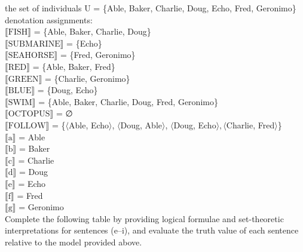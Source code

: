 {\ea the set of individuals U = \{Able, Baker, Charlie, Doug, Echo, Fred, Geronimo\}
\ex denotation assignments:\\
$\llbracket\text{FISH}\rrbracket$  = \{Able, Baker, Charlie, Doug\}\\
$\llbracket\text{SUBMARINE}\rrbracket$  = \{Echo\}\\
$\llbracket\text{SEAHORSE}\rrbracket$  = \{Fred, Geronimo\}\\
$\llbracket\text{RED}\rrbracket$  = \{Able, Baker, Fred\}\\
$\llbracket\text{GREEN}\rrbracket$  = \{Charlie, Geronimo\}\\
$\llbracket\text{BLUE}\rrbracket$  = \{Doug, Echo\}\\
$\llbracket\text{SWIM}\rrbracket$  = \{Able, Baker, Charlie, Doug, Fred, Geronimo\}\\
$\llbracket\text{OCTOPUS}\rrbracket$  = ∅\\
{}$\llbracket\text{FOLLOW}\rrbracket$  = \{$\langle$Able, Echo$\rangle$, $\langle$Doug, Able$\rangle$, $\langle$Doug, Echo$\rangle,\langle$Charlie, Fred$\rangle$\}\\ 
$\llbracket\text{a}\rrbracket$  = Able    \\
$\llbracket\text{b}\rrbracket$  = Baker   \\
$\llbracket\text{c}\rrbracket$  = Charlie \\
$\llbracket\text{d}\rrbracket$  = Doug\\
$\llbracket\text{e}\rrbracket$  = Echo\\
$\llbracket\text{f}\rrbracket$  = Fred\\ 
$\llbracket\text{g}\rrbracket$  = Geronimo\\
    \z \z
\newpage 
\ea  
          Complete the following table by providing logical formulae and set-theoretic interpretations for sentences (e–i), and evaluate the truth value of each sentence relative to the model provided above.
    \z 

}
